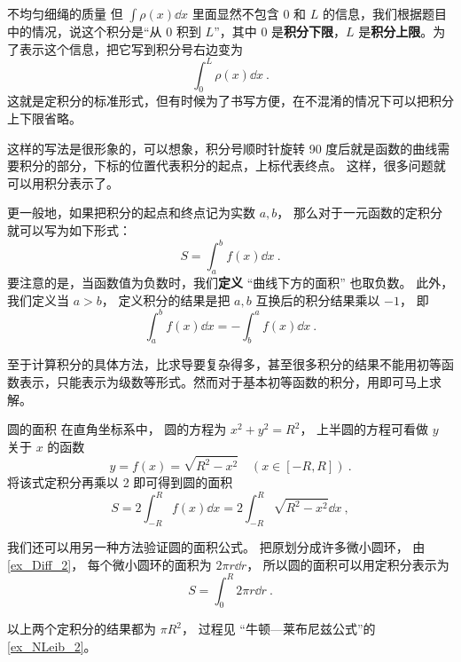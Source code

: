 \begin{example}{不均匀细绳的质量}
但 $\int \rho(x) \dd{x}$ 里面显然不包含 $0$ 和 $L$ 的信息，我们根据题目中的情况，说这个积分是“从 $0$ 积到 $L$”，其中 $0$ 是\textbf{积分下限}，$L$ 是\textbf{积分上限}。为了表示这个信息，把它写到积分号右边变为
\begin{equation}
\int_0^L \rho(x) \dd{x}~.
\end{equation}
这就是定积分的标准形式，但有时候为了书写方便，在不混淆的情况下可以把积分上下限省略。
\end{example}

这样的写法是很形象的，可以想象，积分号顺时针旋转 90 度后就是函数的曲线需要积分的部分，下标的位置代表积分的起点，上标代表终点。 这样，很多问题就可以用积分表示了。

更一般地，如果把积分的起点和终点记为实数 $a,b$， 那么对于一元函数的定积分就可以写为如下形式：
\begin{equation}
S=\int^b_a f(x) \dd x~.
\end{equation}
要注意的是，当函数值为负数时，我们\textbf{定义} “曲线下方的面积” 也取负数。 此外，我们定义当 $a > b$， 定义积分的结果是把 $a,b$ 互换后的积分结果乘以 $-1$， 即
\begin{equation}
\int^b_a f(x) \dd x = -\int^a_b f(x) \dd x~.
\end{equation}

至于计算积分的具体方法，比求导要复杂得多，甚至很多积分的结果不能用初等函数表示，只能表示为级数等形式。然而对于基本初等函数的积分，用即可马上求解。

\begin{example}{圆的面积}\label{ex_DefInt_2}
在直角坐标系中， 圆的方程为 $x^2 + y^2 = R^2$， 上半圆的方程可看做 $y$ 关于 $x$ 的函数
\begin{equation}
y = f(x) = \sqrt{R^2 - x^2} \quad (x\in [-R,R])~.
\end{equation}
将该式定积分再乘以 2 即可得到圆的面积
\begin{equation}
S = 2\int_{-R}^{R} f(x) \dd{x} = 2\int_{-R}^{R} \sqrt{R^2 - x^2} \dd{x}~,
\end{equation}

我们还可以用另一种方法验证圆的面积公式。 把原划分成许多微小圆环， 由\autoref{ex_Diff_2}， 每个微小圆环的面积为 $2\pi r\dd{r}$， 所以圆的面积可以用定积分表示为
\begin{equation}
S = \int_0^{R} 2\pi r\dd{r}~.
\end{equation}

以上两个定积分的结果都为 $\pi R^2$， 过程见 “牛顿—莱布尼兹公式”的\autoref{ex_NLeib_2}。
\end{example}

